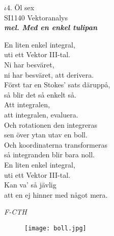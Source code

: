 \documentclass[a6paper,10pt]{article}
\newcommand{\mel}[1]{\small\textbf{\textit{mel. #1 \\}}}
\begin{document}
\setlength{\oddsidemargin}{-0.47in}
\noindent
\begin{center}
\Large $\iota4$. Öl sex \\ 
\footnotesize SI1140 Vektoranalys\\
\mel{Med en enkel tulipan}
\end{center}
En liten enkel integral, \\
uti ett Vektor III-tal. \\
Ni har besväret, \\
ni har besväret, att derivera. 
\vspace{5pt} \\
Först tar en Stokes' sats däruppå, \\
så blir det så enkelt så. \\
Att integralen, \\
att integralen, evaluera. 
\vspace{5pt} \\
Och rotationen den integreras \\
sen över ytan utav en boll. \\
Och koordinaterna transformeras \\
så integranden blir bara noll. 
\vspace{5pt} \\
En liten enkel integral, \\
uti ett Vektor III-tal. \\
Kan va' så jävlig \\
att en ej hinner med något mera. 
\begin{flushright}
\textit{F-CTH}
\end{flushright}
\begin{figure}[!h]
\hspace{120pt}\texttt{[image: boll.jpg]}
\end{figure}
\end{document}
